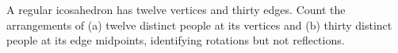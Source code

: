 A regular icosahedron has twelve vertices and thirty edges. Count the arrangements of (a) twelve distinct people at its vertices and (b) thirty distinct people at its edge midpoints, identifying rotations but not reflections.
